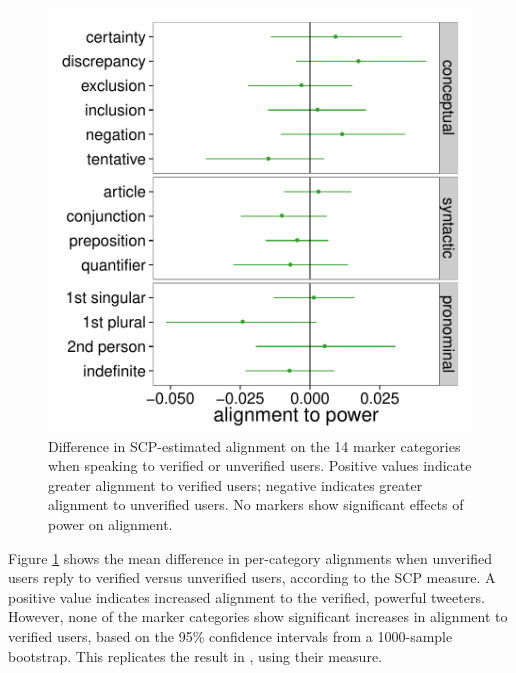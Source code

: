 \documentclass{acm_proc_article-sp}
\begin{document}
\begin{figure}[t]
\centering
\includegraphics[width=.9\columnwidth]{graphics/www2016_dnmpowerdiff_verif_final.pdf}
\caption{Difference in SCP-estimated alignment on the 14 marker categories when speaking to verified or unverified users. Positive values indicate greater alignment to verified users; negative indicates greater alignment to unverified users. No markers show significant effects of power on alignment.}\label{fig:dnm-verified}
\end{figure}

Figure \ref{fig:dnm-verified} shows the mean difference in per-category alignments when unverified users reply to verified versus unverified users, according to the SCP measure.  A positive value indicates increased alignment to the verified, powerful tweeters.  However, none of the marker categories show significant increases in alignment to verified users, based on the 95\% confidence intervals from a 1000-sample bootstrap.  This replicates the result in \cite{DNMGamonDumais2011}, using their measure.
\end{document}
